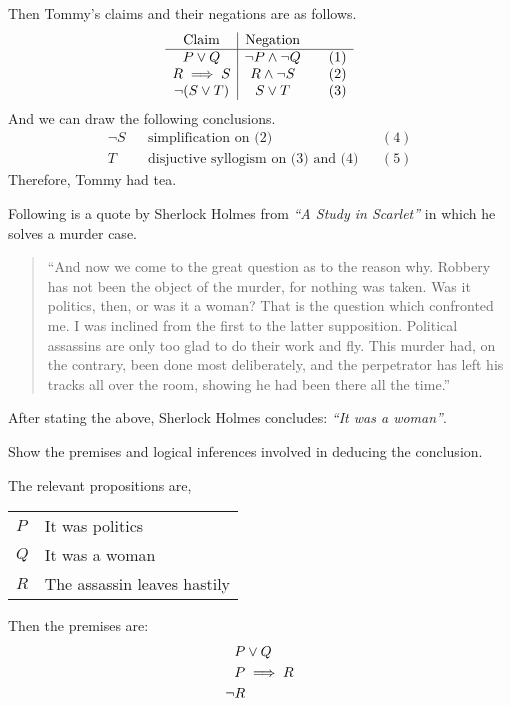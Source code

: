 \documentclass[a4paper]{exam}
\begin{document}
\begin{questions}
\begin{solution}
    Then Tommy's claims and their negations are as follows.
    \[
      \begin{array}{c|c@{\qquad}r}
        \text{Claim} & \text{Negation}\\
        \hline
        P \lor Q & \neg P \land \neg Q &  (1)\\
        R \implies S & R\land \neg S &  (2)\\
        \neg(S\lor T) & S\lor T &  (3)
      \end{array}
    \]
    And we can draw the following conclusions.
    \begin{align*}
      \neg S && \text{simplification on (2)} && (4)\\
      T && \text{disjuctive syllogism on (3) and (4)} && (5)
    \end{align*}
    Therefore, Tommy had tea.
  \end{solution}

  \question Following is a quote by Sherlock Holmes from \textit{“A Study in Scarlet”} in which he solves a murder case.
\begin{quote}
``And now we come to the great question as to the reason why. Robbery has not been the object of the murder, for nothing was taken. Was it politics, then, or was it a woman? That is the question which confronted me. I was inclined from the first to the latter supposition. Political assassins are only too glad to do their work and fly. This murder had, on the contrary, been done most deliberately, and the perpetrator has left his tracks all over the room, showing he had been there all the time.''
\end{quote}
After stating the above, Sherlock Holmes concludes: \textit{``It was a woman''}.

Show the premises and logical inferences involved in deducing the conclusion.

  \begin{solution}
    The relevant propositions are,\\
    \begin{tabular}{l@{ : }l}
      $P$ & It was politics\\
      $Q$ & It was a woman\\
      $R$ & The assassin leaves hastily
    \end{tabular}

    Then the premises are:
    \begin{align}
    \setcounter{equation}{0}
      P & \lor Q \label{pa}\\
      P & \implies R \label{pb}\\
      \neg R \label{pc}
    \end{align}


\end{solution}
\end{questions}
\end{document}
